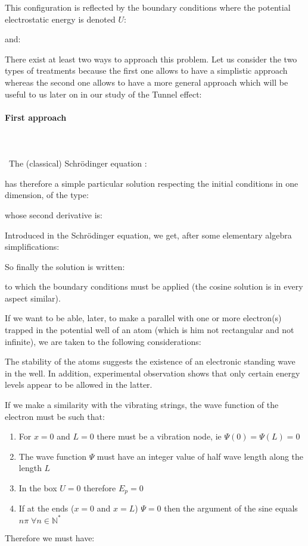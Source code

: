 	This configuration is reflected by the boundary conditions where the potential electrostatic energy is denoted $U$:
	
	and:
	
	There exist at least two ways to approach this problem. Let us consider the two types of treatments because the first one allows to have a simplistic approach whereas the second one allows to have a more general approach which will be useful to us later on in our study of the Tunnel effect:
	
	\paragraph{First approach}\mbox{}\\\\\
	The (classical) Schrödinger equation :
	
	has therefore a simple particular solution respecting the initial conditions in one dimension, of the type:
	
	whose second derivative is:
	
	Introduced in the Schrödinger equation, we get, after some elementary algebra simplifications:
	
	So finally the solution is written:
	
	to which the boundary conditions must be applied (the cosine solution is in every aspect similar).

	If we want to be able, later, to make a parallel with one or more electron(s) trapped in the potential well of an atom (which is him not rectangular and not infinite), we are taken to the following considerations:

	The stability of the atoms suggests the existence of an electronic standing wave in the well. In addition, experimental observation shows that only certain energy levels appear to be allowed in the latter.

	If we make a similarity with the vibrating strings, the wave function of the electron must be such that:
	\begin{enumerate}
		\item For $x=0$ and $L=0$ there must be a vibration node, ie $\Psi(0)=\Psi(L)=0$

		\item The wave function $\Psi$ must have an integer value of half wave length along the length $L$

		\item In the box $U=0$ therefore $E_p=0$

		\item If at the ends ($x=0$ and $x=L$) $\Psi=0$ then the argument of the sine equals $n\pi\; \forall n\in\mathbb{N}^{*}$
	\end{enumerate}
	Therefore we must have:
	
